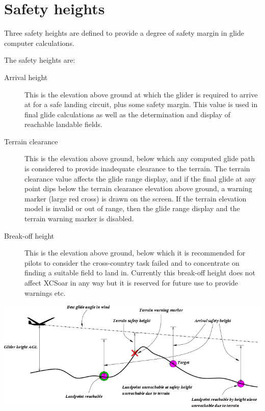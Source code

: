 \documentclass[a4paper,12pt]{refrep}
\begin{document}
\section{Safety heights}\label{sec:safety-heights}

Three safety heights are defined to provide a degree of safety margin
in glide computer calculations.  

The safety heights are:
\begin{description}
\item[Arrival height]  This is the elevation above ground at which
 the glider is required to arrive at for a safe landing circuit, plus
 some safety margin.  This value is used in final glide calculations as
 well as the determination and display of reachable landable fields.
\item[Terrain clearance]
 This is the elevation above ground, below which any computed glide
 path is considered to provide inadequate clearance to the terrain.
 The terrain clearance value affects the glide range display, and if
 the final glide at any point dips below the terrain clearance
 elevation above ground, a warning marker (large red cross) is drawn
 on the screen.  If the terrain elevation model is invalid or out of
 range, then the glide range display and the terrain warning marker is
 disabled.
\item[Break-off height]  This is the elevation above ground, below which 
 it is recommended for pilots to consider the cross-country task
 failed and to concentrate on finding a suitable field to land in.
 Currently this break-off height does not affect XCSoar in any way but
 it is reserved for future use to provide warnings etc.
\end{description}

\begin{maxipage}
\begin{center}
\includegraphics[angle=0,width=\linewidth,keepaspectratio='true']{figures/fig-terrain.png}
\end{center}
\end{maxipage}
\end{document}
